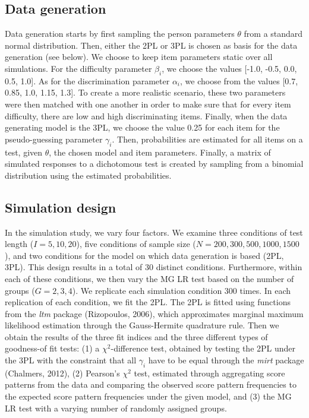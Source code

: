 \documentclass[Royal,sageapa,times,doublespace]{sagej}
\begin{document}
\subsection{Data generation}
Data generation starts by first sampling the person parameters $\theta$ from a standard normal distribution. Then, either the 2PL or 3PL is chosen as basis for the data generation (see below). We choose to keep item parameters static over all simulations. For the difficulty parameter $\beta_i$, we choose the values [-1.0, -0.5, 0.0, 0.5, 1.0]. As for the discrimination parameter $\alpha_i$, we choose from the values [0.7, 0.85, 1.0, 1.15, 1.3]. To create a more realistic scenario, these two parameters were then matched with one another in order to make sure that for every item difficulty, there are low and high discriminating items. Finally, when the data generating model is the 3PL, we choose the value 0.25 for each item for the pseudo-guessing parameter $\gamma_i$. Then, probabilities are estimated for all items on a test, given $\theta$, the chosen model and item parameters. Finally, a matrix of simulated responses to a dichotomous test is created by sampling from a binomial distribution using the estimated probabilities. 
\subsection{Simulation design}
In the simulation study, we vary four factors. We examine three conditions of test length ($I = 5, 10, 20$), five conditions of sample size ($N = 200, 300, 500, 1000, 1500$), and two conditions for the model on which data generation is based (2PL, 3PL). This design results in a total of 30 distinct conditions. Furthermore, within each of these conditions, we then vary the MG LR test based on the number of groups ($G = 2, 3, 4$). We replicate each simulation condition 300 times. In each replication of each condition, we fit the 2PL. The 2PL is fitted using functions from the \textit{ltm} package (Rizopoulos, 2006), which approximates marginal maximum likelihood estimation through the Gauss-Hermite quadrature rule. Then we obtain the results of the three fit indices and the three different types of goodness-of fit tests: (1) a $\chi^2$-difference test, obtained by testing the 2PL under the 3PL with the constraint that all $\gamma_i$ have to be equal through the \textit{mirt} package (Chalmers, 2012), (2) Pearson's $\chi^2$ test, estimated through aggregating score patterns from the data and comparing the observed score pattern frequencies to the expected score pattern frequencies under the given model, and (3) the MG LR test with a varying number of randomly assigned groups. 
\end{document}
